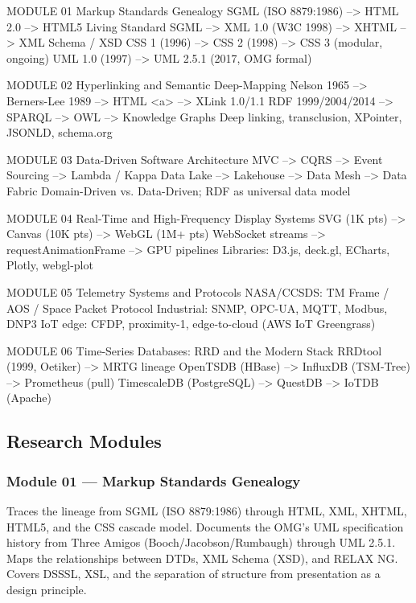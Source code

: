 \documentclass[11pt,letterpaper]{article}
\begin{document}
\begin{asciibox}
MODULE 01  Markup Standards Genealogy
           SGML (ISO 8879:1986) --> HTML 2.0 --> HTML5 Living Standard
           SGML --> XML 1.0 (W3C 1998) --> XHTML --> XML Schema / XSD
           CSS 1 (1996) --> CSS 2 (1998) --> CSS 3 (modular, ongoing)
           UML 1.0 (1997) --> UML 2.5.1 (2017, OMG formal)

MODULE 02  Hyperlinking and Semantic Deep-Mapping
           Nelson 1965 --> Berners-Lee 1989 --> HTML <a> --> XLink 1.0/1.1
           RDF 1999/2004/2014 --> SPARQL --> OWL --> Knowledge Graphs
           Deep linking, transclusion, XPointer, JSONLD, schema.org

MODULE 03  Data-Driven Software Architecture
           MVC --> CQRS --> Event Sourcing --> Lambda / Kappa
           Data Lake --> Lakehouse --> Data Mesh --> Data Fabric
           Domain-Driven vs. Data-Driven; RDF as universal data model

MODULE 04  Real-Time and High-Frequency Display Systems
           SVG (1K pts) --> Canvas (10K pts) --> WebGL (1M+ pts)
           WebSocket streams --> requestAnimationFrame --> GPU pipelines
           Libraries: D3.js, deck.gl, ECharts, Plotly, webgl-plot

MODULE 05  Telemetry Systems and Protocols
           NASA/CCSDS: TM Frame / AOS / Space Packet Protocol
           Industrial: SNMP, OPC-UA, MQTT, Modbus, DNP3
           IoT edge: CFDP, proximity-1, edge-to-cloud (AWS IoT Greengrass)

MODULE 06  Time-Series Databases: RRD and the Modern Stack
           RRDtool (1999, Oetiker) --> MRTG lineage
           OpenTSDB (HBase) --> InfluxDB (TSM-Tree) --> Prometheus (pull)
           TimescaleDB (PostgreSQL) --> QuestDB --> IoTDB (Apache)
\end{asciibox}

\subsection{Research Modules}

\subsubsection{Module 01 --- Markup Standards Genealogy}
Traces the lineage from SGML (ISO 8879:1986) through HTML, XML, XHTML, HTML5, and the CSS cascade model. Documents the OMG's UML specification history from Three Amigos (Booch/Jacobson/Rumbaugh) through UML 2.5.1. Maps the relationships between DTDs, XML Schema (XSD), and RELAX NG. Covers DSSSL, XSL, and the separation of structure from presentation as a design principle.
\end{document}
